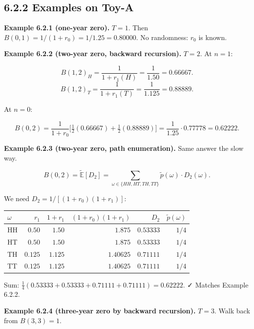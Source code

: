 \documentclass[
  10pt,
  twoside]{book}
\newcounter{none} %
\begin{document}
\subsection{6.2.2 Examples on Toy-A}\label{examples-on-toy-a-1}

\textbf{Example 6.2.1 (one-year zero).} \(T = 1\). Then
\(B(0, 1) = 1/(1 + r_0) = 1/1.25 = 0.80000\). No randomness: \(r_0\) is
known.

\textbf{Example 6.2.2 (two-year zero, backward recursion).} \(T = 2\).
At \(n = 1\):

\[B(1, 2)_H = \frac{1}{1 + r_1(H)} = \frac{1}{1.50} = 0.66667.\]
\[B(1, 2)_T = \frac{1}{1 + r_1(T)} = \frac{1}{1.125} = 0.88889.\]

At \(n = 0\):

\[B(0, 2) = \frac{1}{1 + r_0}\bigl[\tfrac{1}{2}(0.66667) + \tfrac{1}{2}(0.88889)\bigr] = \frac{1}{1.25} \cdot 0.77778 = 0.62222.\]

\textbf{Example 6.2.3 (two-year zero, path enumeration).} Same answer
the slow way.

\[B(0, 2) = \tilde{\mathbb E}[D_2] = \sum_{\omega \in \{HH, HT, TH, TT\}} \tilde p(\omega) \cdot D_2(\omega).\]

We need \(D_2 = 1/[(1+r_0)(1+r_1)]\):

{\def\LTcaptype{none} %
\begin{table}[H]
\centering
\begin{tabular}{|l|r|r|r|r|r|}
\toprule
\(\omega\) & \(r_1\) & \(1 + r_1\) & \((1+r_0)(1+r_1)\) & \(D_2\) & \(\tilde p(\omega)\) \\
\midrule



HH & \(0.50\) & \(1.50\) & \(1.875\) & \(0.53333\) & \(1/4\) \\
HT & \(0.50\) & \(1.50\) & \(1.875\) & \(0.53333\) & \(1/4\) \\
TH & \(0.125\) & \(1.125\) & \(1.40625\) & \(0.71111\) & \(1/4\) \\
TT & \(0.125\) & \(1.125\) & \(1.40625\) & \(0.71111\) & \(1/4\) \\
\bottomrule
\end{tabular}
\end{table}
}

Sum: \(\tfrac{1}{4}(0.53333 + 0.53333 + 0.71111 + 0.71111) = 0.62222.\)
✓ Matches Example 6.2.2.

\textbf{Example 6.2.4 (three-year zero by backward recursion).}
\(T = 3\). Walk back from \(B(3, 3) = 1\).
\end{document}
